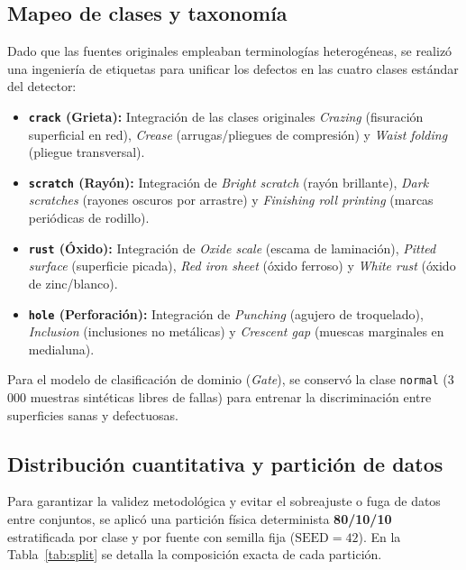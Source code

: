 \documentclass[11pt,a4paper]{article}
\begin{document}
\subsection{Mapeo de clases y taxonomía}
Dado que las fuentes originales empleaban terminologías heterogéneas, se realizó una
ingeniería de etiquetas para unificar los defectos en las cuatro clases estándar del
detector:
\begin{itemize}[leftmargin=1.6em,itemsep=0.15em]
  \item \textbf{\texttt{crack} (Grieta):} Integración de las clases originales
  \emph{Crazing} (fisuración superficial en red), \emph{Crease} (arrugas/pliegues
  de compresión) y \emph{Waist folding} (pliegue transversal).
  \item \textbf{\texttt{scratch} (Rayón):} Integración de \emph{Bright scratch}
  (rayón brillante), \emph{Dark scratches} (rayones oscuros por arrastre) y
  \emph{Finishing roll printing} (marcas periódicas de rodillo).
  \item \textbf{\texttt{rust} (Óxido):} Integración de \emph{Oxide scale} (escama
  de laminación), \emph{Pitted surface} (superficie picada), \emph{Red iron sheet}
  (óxido ferroso) y \emph{White rust} (óxido de zinc/blanco).
  \item \textbf{\texttt{hole} (Perforación):} Integración de \emph{Punching}
  (agujero de troquelado), \emph{Inclusion} (inclusiones no metálicas) y
  \emph{Crescent gap} (muescas marginales en medialuna).
\end{itemize}
Para el modelo de clasificación de dominio (\emph{Gate}), se conservó la clase
\texttt{normal} (3\,000 muestras sintéticas libres de fallas) para entrenar la
discriminación entre superficies sanas y defectuosas.

\subsection{Distribución cuantitativa y partición de datos}
Para garantizar la validez metodológica y evitar el sobreajuste o fuga de datos entre
conjuntos, se aplicó una partición física determinista \textbf{80/10/10} estratificada
por clase y por fuente con semilla fija ($\text{SEED}=42$). En la Tabla~\ref{tab:split}
se detalla la composición exacta de cada partición.
\end{document}
